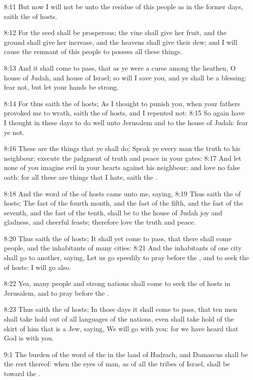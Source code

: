 8:11 But now I will not be unto the residue of this people as in the former days, saith the \LORD of hosts.

8:12 For the seed shall be prosperous; the vine shall give her fruit, and the ground shall give her increase, and the heavens shall give their dew; and I will cause the remnant of this people to possess all these things.

8:13 And it shall come to pass, that as ye were a curse among the heathen, O house of Judah, and house of Israel; so will I save you, and ye shall be a blessing: fear not, but let your hands be strong.

8:14 For thus saith the \LORD of hosts; As I thought to punish you, when your fathers provoked me to wrath, saith the \LORD of hosts, and I repented not: 8:15 So again have I thought in these days to do well unto Jerusalem and to the house of Judah: fear ye not.

8:16 These are the things that ye shall do; Speak ye every man the truth to his neighbour; execute the judgment of truth and peace in your gates: 8:17 And let none of you imagine evil in your hearts against his neighbour; and love no false oath: for all these are things that I hate, saith the \LORD.

8:18 And the word of the \LORD of hosts came unto me, saying, 8:19 Thus saith the \LORD of hosts; The fast of the fourth month, and the fast of the fifth, and the fast of the seventh, and the fast of the tenth, shall be to the house of Judah joy and gladness, and cheerful feasts; therefore love the truth and peace.

8:20 Thus saith the \LORD of hosts; It shall yet come to pass, that there shall come people, and the inhabitants of many cities: 8:21 And the inhabitants of one city shall go to another, saying, Let us go speedily to pray before the \LORD, and to seek the \LORD of hosts: I will go also.

8:22 Yea, many people and strong nations shall come to seek the \LORD of hosts in Jerusalem, and to pray before the \LORD.

8:23 Thus saith the \LORD of hosts; In those days it shall come to pass, that ten men shall take hold out of all languages of the nations, even shall take hold of the skirt of him that is a Jew, saying, We will go with you: for we have heard that God is with you.

9:1 The burden of the word of the \LORD in the land of Hadrach, and Damascus shall be the rest thereof: when the eyes of man, as of all the tribes of Israel, shall be toward the \LORD.

